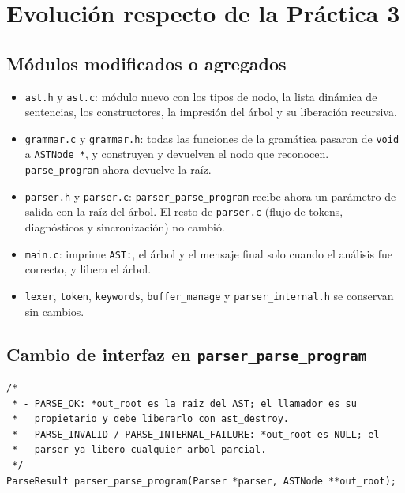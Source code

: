 \documentclass[12pt,letterpaper]{article}
\begin{document}
\section*{Evolución respecto de la Práctica 3}

\subsection*{Módulos modificados o agregados}

\begin{itemize}
\item \texttt{ast.h} y \texttt{ast.c}: módulo nuevo con los tipos de nodo, la lista dinámica de sentencias,
  los constructores, la impresión del árbol y su liberación recursiva.
\item \texttt{grammar.c} y \texttt{grammar.h}: todas las funciones de la gramática pasaron de \texttt{void}
  a \texttt{ASTNode *}, y construyen y devuelven el nodo que reconocen. \texttt{parse\_program} ahora
  devuelve la raíz.
\item \texttt{parser.h} y \texttt{parser.c}: \texttt{parser\_parse\_program} recibe ahora un parámetro de
  salida con la raíz del árbol. El resto de \texttt{parser.c} (flujo de tokens, diagnósticos y
  sincronización) no cambió.
\item \texttt{main.c}: imprime \texttt{AST:}, el árbol y el mensaje final solo cuando el análisis fue
  correcto, y libera el árbol.
\item \texttt{lexer}, \texttt{token}, \texttt{keywords}, \texttt{buffer\_manage} y
  \texttt{parser\_internal.h} se conservan sin cambios.
\end{itemize}

\subsection*{Cambio de interfaz en \texttt{parser\_parse\_program}}

\begin{lstlisting}[style=modernc, caption={Interfaz modificada de \texttt{parser.h}.}]
/*
 * - PARSE_OK: *out_root es la raiz del AST; el llamador es su
 *   propietario y debe liberarlo con ast_destroy.
 * - PARSE_INVALID / PARSE_INTERNAL_FAILURE: *out_root es NULL; el
 *   parser ya libero cualquier arbol parcial.
 */
ParseResult parser_parse_program(Parser *parser, ASTNode **out_root);
\end{lstlisting}
\end{document}
